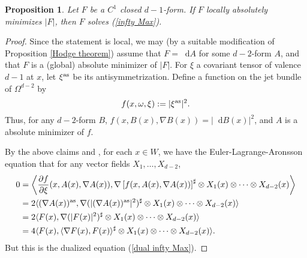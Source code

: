 \documentclass[reqno,11pt]{amsart}
\newcommand*\dif{\mathop{}\!\mathrm{d}}
\newtheorem{proposition}[theorem]{Proposition}
\theoremstyle{definition}
\numberwithin{equation}{section}
\begin{document}
\begin{proposition}
Let $F$ be a $C^1$ closed $d - 1$-form.
If $F$ locally absolutely minimizes $|F|$, then $F$ solves (\ref{infty Max}).
\end{proposition}
\begin{proof}
Since the statement is local, we may (by a suitable modification of Proposition \ref{Hodge theorem}) assume that $F = \dif A$ for some $d - 2$-form $A$, and that $F$ is a (global) absolute minimizer of $|F|$.
For $\xi$ a covariant tensor of valence $d - 1$ at $x$, let $\xi^{\rm as}$ be its antisymmetrization.
Define a function on the jet bundle of $\Omega^{d - 2}$ by
$$f(x, \omega, \xi) := |\xi^{\rm as}|^2.$$
Thus, for any $d - 2$-form $B$, $f(x, B(x), \nabla B(x)) = |\dif B(x)|^2$, and $A$ is a absolute minimizer of $f$.

By the above claims and \cite[Theorem 5.2]{Barron2001}, for each $x \in W$, we have the Euler-Lagrange-Aronsson equation that for any vector fields $X_1, \dots, X_{d - 2}$,
\begin{align*}
0 
&= \left\langle \frac{\partial f}{\partial \xi}(x, A(x), \nabla A(x)), \nabla \left[f(x, A(x), \nabla A(x))\right]^\sharp \otimes X_1(x) \otimes \cdots \otimes X_{d - 2}(x)\right\rangle \\
&= 2\langle (\nabla A(x))^{\rm as}, \nabla(|(\nabla A(x))^{\rm as}|^2)^\sharp \otimes X_1(x) \otimes \cdots \otimes X_{d - 2}(x)\rangle \\
&= 2\langle F(x), \nabla(|F(x)|^2)^\sharp \otimes X_1(x) \otimes \cdots \otimes X_{d - 2}(x)\rangle \\
&= 4\langle F(x), \langle \nabla F(x), F(x)\rangle^\sharp \otimes X_1(x) \otimes \cdots \otimes X_{d - 2}(x)\rangle.
\end{align*}
But this is the dualized equation (\ref{dual infty Max}).
\end{proof}
\end{document}
